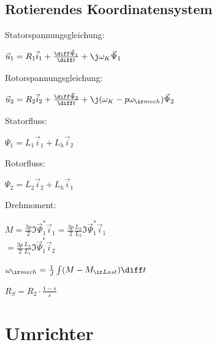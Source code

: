 \documentclass[german]{latex4ei_fs}
\begin{document}
\begin{sectionbox}
  \subsection{Rotierendes Koordinatensystem}

Statorspannungsgleichung:

  $\vec u_1 = R_1 \vec i_1 + \frac{\diff \vec \Psi_1}{\diff t} + \j \omega_K \vec \Psi_1$

Rotorspannungsgleichung:

  $\vec u_2 = R_2 \vec i_2 + \frac{\diff \vec \Psi_2}{\diff t} + \j (\omega_K - p \omega_{\ir mech} ) \vec \Psi_2$


Statorfluss:

  $\Psi_1 = L_1 \vec i_1 + L_h \vec i_2$

Rotorfluss:

  $\Psi_2 = L_2 \vec i_2 + L_h \vec i_1$

Drehmoment:

  $M = \frac{3 p}{2} \Im{\vec \Psi_1^* \vec i_1} = \frac{3p}{2} \frac{L_h}{L_2} \Im{\vec \Psi_1^* \vec i_1}$ \\$ =  \frac{3p}{2} \frac{L_h}{L_1} \Im{\vec \Psi_1^* \vec i_2} $

  $\omega_{\ir mech} = \frac{1}{J} \int (M - M_{\ir Last}) \diff t$

$R_S = R_2 \cdot \frac{1 -s }{s}$

 \end{sectionbox}

 \section{Umrichter}
\end{document}
